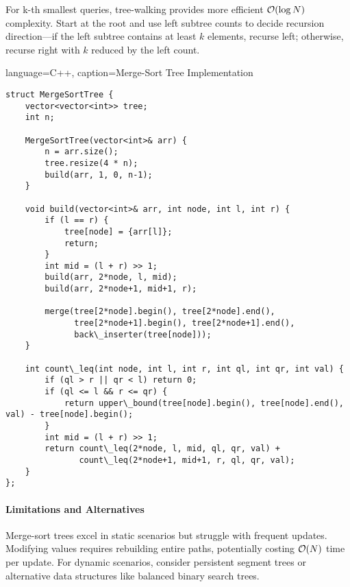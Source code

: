 For k-th smallest queries, tree-walking provides more efficient $\mathcal{O}(\log N)$ complexity. Start at the root and use left subtree counts to decide recursion direction—if the left subtree contains at least $k$ elements, recurse left; otherwise, recurse right with $k$ reduced by the left count.

\begin{marginlisting}[0pt]{language=C++, caption=Merge-Sort Tree Implementation}
\begin{lstlisting}
struct MergeSortTree {
    vector<vector<int>> tree;
    int n;
    
    MergeSortTree(vector<int>& arr) {
        n = arr.size();
        tree.resize(4 * n);
        build(arr, 1, 0, n-1);
    }
    
    void build(vector<int>& arr, int node, int l, int r) {
        if (l == r) {
            tree[node] = {arr[l]};
            return;
        }
        int mid = (l + r) >> 1;
        build(arr, 2*node, l, mid);
        build(arr, 2*node+1, mid+1, r);
        
        merge(tree[2*node].begin(), tree[2*node].end(),
              tree[2*node+1].begin(), tree[2*node+1].end(),
              back\_inserter(tree[node]));
    }
    
    int count\_leq(int node, int l, int r, int ql, int qr, int val) {
        if (ql > r || qr < l) return 0;
        if (ql <= l && r <= qr) {
            return upper\_bound(tree[node].begin(), tree[node].end(), val) - tree[node].begin();
        }
        int mid = (l + r) >> 1;
        return count\_leq(2*node, l, mid, ql, qr, val) +
               count\_leq(2*node+1, mid+1, r, ql, qr, val);
    }
};
\end{lstlisting}
\end{marginlisting}

\paragraph{Limitations and Alternatives}

Merge-sort trees excel in static scenarios but struggle with frequent updates. Modifying values requires rebuilding entire paths, potentially costing $\mathcal{O}(N)$ time per update. For dynamic scenarios, consider persistent segment trees or alternative data structures like balanced binary search trees.


